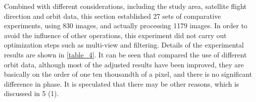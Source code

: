 \documentclass[a4paper,fleqn]{cas-sc}
\begin{document}
Combined with different considerations, including the study area, satellite flight direction and orbit data, this section established 27 sets of comparative experiments, using 830 images, and actually processing 1179 images. In order to avoid the influence of other operations, this experiment did not carry out optimization steps such as multi-view and filtering. Details of the experimental results are shown in \ref{table_4}. It can be seen that compared the use of different orbit data, although most of the adjusted results have been improved, they are basically on the order of one ten thousandth of a pixel, and there is no significant difference in phase. It is speculated that there may be other reasons, which is discussed in 5 (1). \par

\end{document}
